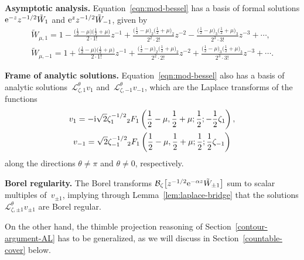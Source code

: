 \documentclass[10pt,a4paper]{amsart}
\newcommand{\series}[1]{\tilde{#1}}
\newcommand{\laplace}{\mathcal{L}}
\numberwithin{equation}{section}
\begin{document}
\textbf{Asymptotic analysis.}
Equation~\eqref{eqn:mod-bessel} has a basis of formal solutions ${\rm e}^{-z} z^{-1/2} \series{W}_1$ and $ {\rm e}^z z^{-1/2} \series{W}_{-1}$,
given by
\begin{gather*}
\series{W}_{\mu,1} = 1 - \frac{\bigl(\frac{1}{2}-\mu\bigr)\bigl(\frac{1}{2}+\mu\bigr)}{2 \cdot 1!} z^{-1} + \frac{\bigl(\frac{1}{2}-\mu\bigr)_2\bigl(\frac{1}{2}+\mu\bigr)_2}{2^2 \cdot 2!} z^{-2}
 - \frac{\bigl(\frac{1}{2}-\mu\bigr)_3\bigl(\frac{1}{2}+\mu\bigr)_3}{2^3 \cdot 3!} z^{-3} + \cdots, \\
\series{W}_{\mu,-1} = 1 + \frac{\bigl(\frac{1}{2}-\mu\bigr)\bigl(\frac{1}{2}+\mu\bigr)}{2 \cdot 1!} z^{-1} + \frac{\bigl(\frac{1}{2}-\mu\bigr)_2\bigl(\frac{1}{2}+\mu\bigr)_2}{2^2 \cdot 2!} z^{-2}
+ \frac{\bigl(\frac{1}{2}-\mu\bigr)_3\bigl(\frac{1}{2}+\mu\bigr)_3}{2^3 \cdot 3!} z^{-3} + \cdots.
\end{gather*}

\textbf{Frame of analytic solutions.}
Equation~\eqref{eqn:mod-bessel} also has a basis of analytic solutions~$\laplace^\theta_{\zeta, 1} v_1$ and~$\laplace^\theta_{\zeta, -1} v_{-1}$, which are the Laplace transforms of the functions
\begin{gather*}
v_1 = -{\rm i}\sqrt{2} \zeta_{1}^{-1/2} {}_2F_1\left(\frac{1}{2}-\mu, \frac{1}{2}+\mu; \frac{1}{2}; -\frac{1}{2}\zeta_{1}\right),\\
v_{-1} =\sqrt{2} \zeta_{-1}^{-1/2} {}_2F_1\left(\frac{1}{2}-\mu, \frac{1}{2}+\mu; \frac{1}{2}; \frac{1}{2}\zeta_{-1}\right)
\end{gather*}
along the directions $\theta \neq \pi$ and $\theta \neq 0$, respectively.

\textbf{Borel regularity.}
The Borel transforms $\mathcal{B}_\zeta\bigl[z^{-1/2} {\rm e}^{-\alpha z} \series{W}_{\pm 1}\bigr]$ sum to scalar multiples of~$v_{\pm 1}$, implying through Lemma~\ref{lem:laplace-bridge} that the solutions $\laplace^\theta_{\zeta, \pm 1} v_{\pm 1}$ are Borel regular.

On the other hand, the thimble projection reasoning of Section~\ref{contour-argument-AL} has to be generalized, as we will discuss in Section~\ref{countable-cover} below.
\end{document}
